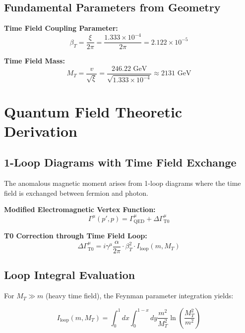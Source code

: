 \documentclass[12pt,a4paper]{article}
\numberwithin{equation}{section}
\begin{document}
	\subsection{Fundamental Parameters from Geometry}
	
	\textbf{Time Field Coupling Parameter:}
	\begin{equation}
		\beta_T = \frac{\xi}{2\pi} = \frac{1.333 \times 10^{-4}}{2\pi} = 2.122 \times 10^{-5}
	\end{equation}
	
	\textbf{Time Field Mass:}
	\begin{equation}
		M_T = \frac{v}{\sqrt{\xi}} = \frac{246.22 \text{ GeV}}{\sqrt{1.333 \times 10^{-4}}} \approx 2131 \text{ GeV}
	\end{equation}
	
	\section{Quantum Field Theoretic Derivation}
	
	\subsection{1-Loop Diagrams with Time Field Exchange}
	
	The anomalous magnetic moment arises from 1-loop diagrams where the time field is exchanged between fermion and photon.
	
	\textbf{Modified Electromagnetic Vertex Function:}
	\begin{equation}
		\Gamma^\mu(p',p) = \Gamma^\mu_{\text{QED}} + \Delta\Gamma^\mu_{\text{T0}}
	\end{equation}
	
	\textbf{T0 Correction through Time Field Loop:}
	\begin{equation}
		\Delta\Gamma^\mu_{\text{T0}} = i\gamma^\mu \frac{\alpha}{2\pi} \cdot \beta_T^2 \cdot I_{\text{loop}}(m,M_T)
	\end{equation}
	
	\subsection{Loop Integral Evaluation}
	
	For $M_T \gg m$ (heavy time field), the Feynman parameter integration yields:
	
	\begin{equation}
		I_{\text{loop}}(m,M_T) = \int_0^1 dx \int_0^{1-x} dy \frac{m^2}{M_T^2} \ln\left(\frac{M_T^2}{m^2}\right)
	\end{equation}
	
\end{document}
